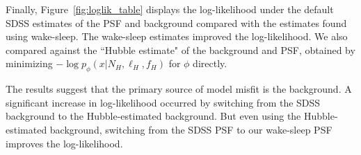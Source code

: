 


Finally, Figure~\ref{fig:loglik_table} displays the log-likelihood under the default SDSS estimates of the PSF and background compared with the estimates found using wake-sleep. 
The wake-sleep estimates improved the log-likelihood.
We also compared against the ``Hubble estimate" of the background and PSF, obtained by minimizing $- \log p_\phi(x | N_{H}, \ell_{H}, f_{H})$ for $\phi$ directly. 

The results suggest that the primary source of model misfit is the background. A significant increase in log-likelihood occurred by switching from the SDSS background to the Hubble-estimated background. 
But even using the Hubble-estimated background, switching from the SDSS PSF to our wake-sleep PSF improves the log-likelihood. 


